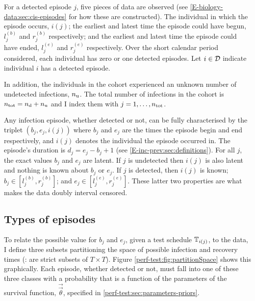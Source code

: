 \documentclass[thesis.tex]{subfiles}
\begin{document}
For a detected episode $j$, five pieces of data are observed (see \cref{E-biology-data:sec:cis-episodes} for how these are constructed).
The individual in which the episode occurs, $i(j)$; the earliest and latest time the episode could have begun, $l_j^{(b)}$ and $r_j^{(b)}$ respectively; and the earliest and latest time the episode could have ended, $l_j^{(e)}$ and $r_j^{(e)}$ respectively.
Over the short calendar period considered, each individual has zero or one detected episodes.
Let $i \in \mathcal{D}$ indicate individual $i$ has a detected episode.

In addition, the individuals in the cohort experienced an unknown number of undetected infections, $n_\text{u}$.
The total number of infections in the cohort is $n_\text{tot} = n_\text{d} + n_\text{u}$ and I index them with $j = 1, \dots, n_\text{tot}$.

Any infection episode, whether detected or not, can be fully characterised by the triplet $(b_j, e_j, i(j))$ where $b_j$ and $e_j$ are the times the episode begin and end respectively, and $i(j)$ denotes the individual the episode occurred in.
The episode's duration is $d_j = e_j - b_j + 1$ (see \cref{E-inc-prev:sec:definitions}).
For all $j$, the exact values $b_j$ and $e_j$ are latent.
If $j$ is undetected then $i(j)$ is also latent and nothing is known about $b_j$ or $e_j$.
If $j$ is detected, then $i(j)$ is known; $b_j \in [l_j^{(b)}, r_j^{(b)}]$; and $e_j \in [l_j^{(e)}, r_j^{(e)}]$.
These latter two properties are what makes the data doubly interval censored.

\subsection{Types of episodes} \label{perf-test:sec:episode-types}

To relate the possible value for $b_j$ and $e_j$, given a test schedule $\mathbb{T}_{i(j)}$, to the data, I define three subsets partitioning the space of possible infection and recovery times (\ie: are strict subsets of $T \times T$).
Figure \ref{perf-test:fig:partitionSpace} shows this graphically.
Each episode, whether detected or not, must fall into one of these three classes with a probability that is a function of the parameters of the survival function, $\vec{\vec{\theta}}$, specified in \cref{perf-test:sec:parameters-priors}.
\end{document}

